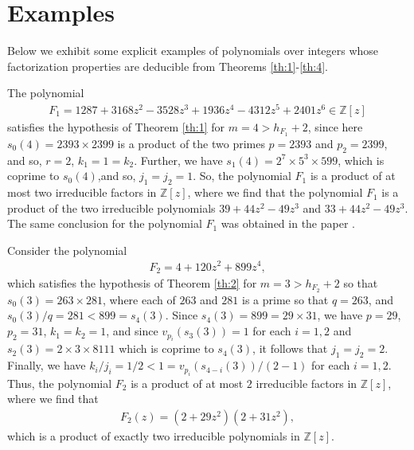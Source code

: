 \documentclass[12pt]{amsart}%
\begin{document}
\section{Examples}
Below we exhibit some explicit examples of polynomials over integers whose factorization properties are deducible from Theorems \ref{th:1}-\ref{th:4}.
\begin{example} The polynomial
\begin{eqnarray*}
F_1=1287 + 3168 z^2 - 3528 z^3 + 1936 z^4 - 4312 z^5 + 2401 z^6\in \mathbb{Z}[z]
\end{eqnarray*}
satisfies the hypothesis of Theorem \ref{th:1} for $m=4>h_{F_1}+2$, since here $s_0(4)=2393\times 2399$ is a product of the two primes $p=2393$ and $p_2=2399$, and so, $r=2$, $k_1=1=k_2$. Further, we have $s_1(4)=2^7\times 5^3\times 599$, which is coprime to $s_0(4)$,and so,  $j_1=j_2=1$. So, the polynomial $F_1$ is a product of at most two irreducible factors in $\mathbb{Z}[z]$, where we find that the polynomial $F_1$ is a product of the two irreducible polynomials $39+44z^2-49z^3$ and $33+44z^2-49z^3$. The same conclusion for the polynomial $F_1$ was obtained in the paper \cite[Theorem 3]{R-J-S}.
\end{example}
\begin{example}
Consider the polynomial
\begin{eqnarray*}
F_2=4 + 120 z^2 + 899 z^4,
\end{eqnarray*}
which satisfies the hypothesis of Theorem \ref{th:2} for $m=3>h_{F_2}+2$ so that $s_0(3)=263\times 281$, where each of $263$ and $281$ is a prime so that $q=263$, and $s_0(3)/q=281<899=s_4(3)$. Since $s_4(3)=899=29\times 31$, we have $p=29$, $p_2=31$, $k_1=k_2=1$, and since $v_{p_i}(s_3(3))=1$ for each $i=1,2$ and $s_2(3)=2\times 3\times 8111$ which is coprime to $s_4(3)$, it follows that $j_1=j_2=2$. Finally, we have $k_i/j_i=1/2<1=v_{p_i}(s_{4-i}(3))/(2-1)$ for each $i=1,2$. Thus, the polynomial $F_2$ is a product of at most $2$ irreducible factors in $\mathbb{Z}[z]$, where we find that
 \begin{eqnarray*}
F_2(z)=(2 + 29 z^2) (2 + 31 z^2),
\end{eqnarray*}
which is a product of exactly two irreducible polynomials in $\mathbb{Z}[z]$.
\end{example}
\end{document}
